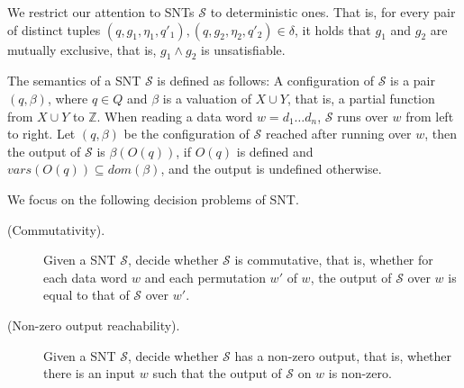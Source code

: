 \documentclass[runningheads,a4paper]{llncs}
\def\Ss{{\mathcal{S} }}
\def\Ii{{\mathbb{Z} }}
\begin{document}
We restrict our attention to SNTs $\Ss$ to deterministic ones. That is, for every pair of distinct tuples $(q, g_1, \eta_1,q'_1), (q, g_2,\eta_2,q'_2) \in \delta$, it holds that $g_1$ and $g_2$ are mutually exclusive, that is, $g_1 \wedge g_2$ is unsatisfiable.

The semantics of a SNT $\Ss$  is defined as follows: A configuration of $\Ss$ is a pair $(q,\beta)$, where $q \in Q$ and $\beta$ is a valuation of $X \cup Y$, that is, a partial function from $X \cup Y$ to $\Ii$. When reading a data word $w=d_1 \dots d_n$, $\Ss$ runs over $w$ from left to right. Let $(q, \beta)$ be the configuration of $\Ss$ reached after running over $w$, then the output of $\Ss$ is $\beta(O(q))$, if $O(q)$ is defined and $vars(O(q)) \subseteq dom(\beta)$, and the output is undefined otherwise.

We focus on the following decision problems of SNT.
\begin{description}
\item[(Commutativity).] Given a SNT $\Ss$, decide whether $\Ss$ is commutative, that is, whether for each data word $w$ and each permutation $w'$ of $w$, the output of $\Ss$ over $w$ is equal to that of $\Ss$ over $w'$.
%
\item[(Non-zero output reachability).] Given a SNT $\Ss$, decide whether $\Ss$ has a non-zero output, that is, whether there is an input $w$ such that the output of $\Ss$ on $w$ is non-zero. 
\end{description}
\end{document}
